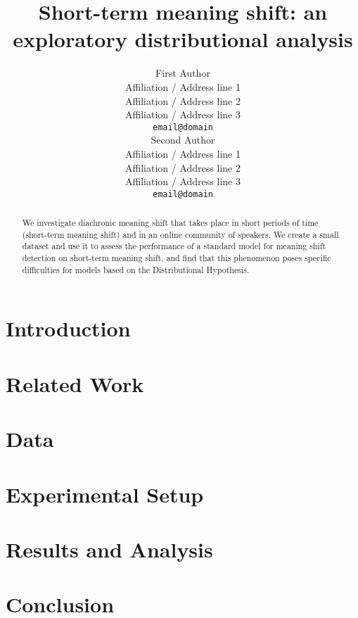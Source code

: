 \documentclass[11pt,a4paper]{article}
\title{Short-term meaning shift: an exploratory distributional analysis}
\author{First Author \\
  Affiliation / Address line 1 \\
  Affiliation / Address line 2 \\
  Affiliation / Address line 3 \\
  {\tt email@domain} \\\And
  Second Author \\
  Affiliation / Address line 1 \\
  Affiliation / Address line 2 \\
  Affiliation / Address line 3 \\
  {\tt email@domain} \\}
\date{}
\begin{document}
\maketitle
\begin{abstract}
We investigate diachronic meaning shift that takes place in short periods of time (short-term meaning shift) and in an online community of speakers. We create a small dataset and use it to assess the performance of a standard model for meaning shift detection on short-term meaning shift, and find that this phenomenon poses specific difficulties for models based on the Distributional Hypothesis. 
\end{abstract}

\section{Introduction}
\label{sect:Introduction}


 
\section{Related Work}
\label{sect:Related_Work}



\section{Data}
\label{sect:Data}



\section{Experimental Setup}
\label{sec:setup}



\section{Results and Analysis}
\label{sect:results}



\section{Conclusion}
\label{sect:conc}






%
%
\end{document}
